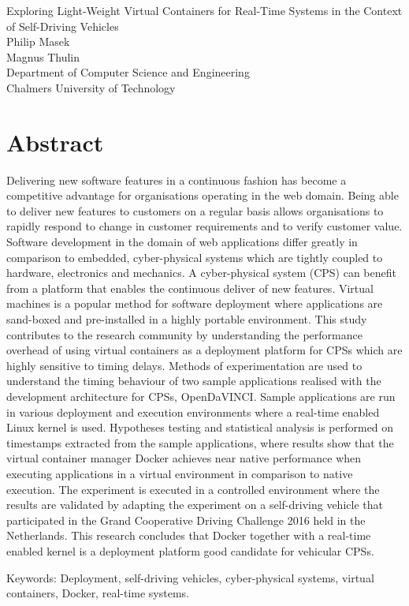 Exploring Light-Weight Virtual Containers for Real-Time Systems in the Context of Self-Driving Vehicles\\
Philip Masek\\
Magnus Thulin\\
Department of Computer Science and Engineering\\
Chalmers University of Technology \setlength{\parskip}{0.5cm}

\thispagestyle{plain}			%
\setlength{\parskip}{0pt plus 1.0pt}
\section*{Abstract}
Delivering new software features in a continuous fashion has become a competitive advantage for organisations operating in the web domain. Being able to deliver new features to customers on a regular basis allows organisations to rapidly respond to change in customer requirements and to verify customer value. Software development in the domain of web applications differ greatly in comparison to embedded, cyber-physical systems which are tightly coupled to hardware, electronics and mechanics. A cyber-physical system (CPS) can benefit from a platform that enables the continuous deliver of new features. Virtual machines is a popular method for software deployment where applications are sand-boxed and pre-installed in a highly portable environment. This study contributes to the research community by understanding the performance overhead of using virtual containers as a deployment platform for CPSs which are highly sensitive to timing delays. Methods of experimentation are used to understand the timing behaviour of two sample applications realised with the development architecture for CPSs, OpenDaVINCI. Sample applications are run in various deployment and execution environments where a real-time enabled Linux kernel is used. Hypotheses testing and statistical analysis is performed on timestamps extracted from the sample applications, where results show that the virtual container manager Docker achieves near native performance when executing applications in a virtual environment in comparison to native execution.  The experiment is executed in a controlled environment where the results are validated by adapting the experiment on a self-driving vehicle that participated in the Grand Cooperative Driving Challenge 2016 held in the Netherlands. This research concludes that Docker together with a real-time enabled kernel is a deployment platform good candidate for vehicular CPSs. 





\vfill
Keywords: Deployment, self-driving vehicles, cyber-physical systems, virtual containers, Docker, real-time systems.

\newpage				%
\thispagestyle{empty}
\mbox{}